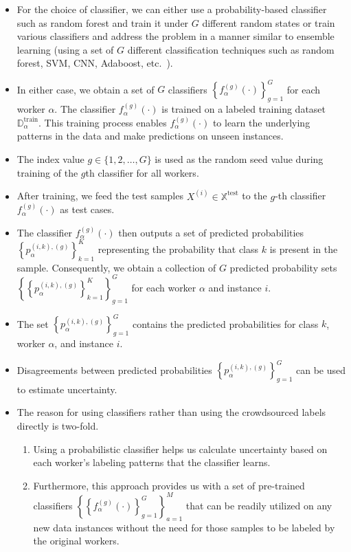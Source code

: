 \documentclass[default]{bst/sn-jnl_mine}%
\begin{document}
\begin{itemize}
    \item For the choice of classifier, we can either use a probability-based classifier such as random forest and train it under $G $ different random states or train various classifiers and address the problem in a manner similar to ensemble learning (using a set of $G $ different classification techniques such as random forest, SVM, CNN, Adaboost, etc.~\cite{zhou_Ensemblelearning_2009}).
    \item In either case, we obtain a set of $G $ classifiers ${\left\{f_{\alpha}^{(g)}( \cdot)\right\}}_{g=1}^G $ for each worker $\alpha $. The classifier $f_{\alpha}^{(g)}( \cdot) $ is trained on a labeled training dataset $\mathbb{D}_\alpha^{\mathrm{train}}$. This training process enables $f_{\alpha}^{(g)}(\cdot) $ to learn the underlying patterns in the data and make predictions on unseen instances.
    \item The index value $g  \in \{1,2,\dots,G\} $ is used as the random seed value during training of the $g$\-th classifier for all workers.
    \item After training, we feed the test samples $X^{(i)}\in \mathbb{X}^{\text{test}} $ to the $g $-th classifier $f_{\alpha}^{(g)}(\cdot) $ as test cases.
    \item The classifier $f_{\alpha}^{(g)}(\cdot) $ then outputs a set of predicted probabilities ${\left\{p_{\alpha}^{(i,k),(g)}\right\}}_{k=1}^{K} $ representing the probability that class $k $ is present in the sample. Consequently, we obtain a collection of $G $ predicted probability sets ${\left\{ {\left\{ p_{\alpha}^{(i,k),(g)}\right\}}_{k=1}^K \right\}}_{g=1}^G $ for each worker $\alpha $ and instance $i $.
    \item The set ${\left\{p_{\alpha}^{(i,k),(g)}\right\}}_{g=1}^G $ contains the predicted probabilities for class $k $,
    worker $\alpha $, and instance $i $.
    \item Disagreements between predicted probabilities ${\left\{p_{\alpha}^{(i,k),(g)}\right\}}_{g=1}^G $ can be used to estimate uncertainty.
    \item The reason for using classifiers rather than using the crowdsourced labels directly is two-fold.
    \begin{enumerate}
        \item Using a probabilistic classifier helps us calculate uncertainty based on each worker's labeling patterns that the classifier learns.
        \item Furthermore, this approach provides us with a set of pre-trained classifiers ${\left\{ {\left\{f_{\alpha}^{(g)}(\cdot) \right\}}_{g=1}^G  \right\}}_{a=1}^{M} $ that can be readily utilized on any new data instances without the need for those samples to be labeled by the original workers.

\end{enumerate}
\end{itemize}
\end{document}
